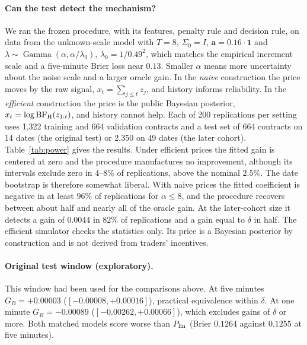 \documentclass[runningheads]{llncs}
\newcommand{\E}{\mathbb E}
\begin{document}
\paragraph{Can the test detect the mechanism?} We ran the frozen procedure, with its features, penalty rule and decision rule, on data from the unknown-scale model with $T=8$, $\Sigma_0=I$, $\boldsymbol a=0.16\cdot\boldsymbol1$ and $\lambda\sim\operatorname{Gamma}(\alpha,\alpha/\lambda_0)$, $\lambda_0=1/0.49^2$, which matches the empirical increment scale and a five-minute Brier loss near $0.13$. Smaller $\alpha$ means more uncertainty about the noise scale and a larger oracle gain. In the \emph{naive} construction the price moves by the raw signal, $x_t=\sum_{j\le t}z_j$, and history informs reliability. In the \emph{efficient} construction the price is the public Bayesian posterior, $x_t=\log\mathrm{BF}_{\rm H}(z_{1:t})$, and history cannot help. Each of 200 replications per setting uses 1,322 training and 664 validation contracts and a test set of 664 contracts on 14 dates (the original test) or 2,350 on 49 dates (the later cohort). Table~\ref{tab:power} gives the results. Under efficient prices the fitted gain is centered at zero and the procedure manufactures no improvement, although its intervals exclude zero in $4$--$8\%$ of replications, above the nominal $2.5\%$. The date bootstrap is therefore somewhat liberal. With naive prices the fitted coefficient is negative in at least $96\%$ of replications for $\alpha\le8$, and the procedure recovers between about half and nearly all of the oracle gain. At the later-cohort size it detects a gain of $0.0044$ in $82\%$ of replications and a gain equal to $\delta$ in half. The efficient simulator checks the statistics only. Its price is a Bayesian posterior by construction and is not derived from traders' incentives.

\begin{table}[t]
\caption{Behavior of the frozen confidence test on simulated unknown-scale data, 200 replications per setting. Oracle gain is $\E(q^*-r^*)^2$. Achieved gain is the mean test $G_B$ with 664 test contracts. The last two columns give the frequency of an interval above zero and of an upper bound below $\delta=0.001$, with 664 and 2,350 test contracts.}
\label{tab:power}
\centering\scriptsize

\end{table}

\paragraph{Original test window (exploratory).} This window had been used for the comparisons above. At five minutes $G_B=+0.00003$ ($[-0.00008,+0.00016]$), practical equivalence within $\delta$. At one minute $G_B=-0.00089$ ($[-0.00262,+0.00066]$), which excludes gains of $\delta$ or more. Both matched models score worse than $P_{\rm lin}$ (Brier $0.1264$ against $0.1255$ at five minutes).
\end{document}
